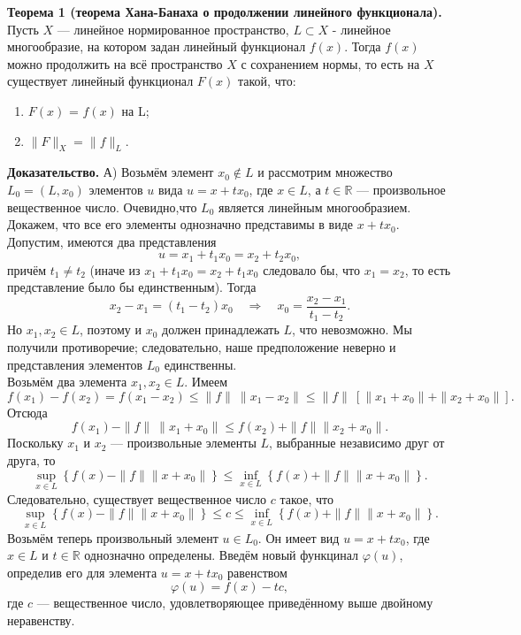 \documentclass[12pt,a4paper, titlepage]{article}
\begin{document}
\textbf{Теорема 1 (теорема Хана-Банаха о продолжении линейного функционала).} Пусть $X$ --- линейное нормированное пространство, $L \subset X$ - линейное многообразие, на котором задан линейный функционал $f(x)$. Тогда $f(x)$ можно продолжить на всё пространство $X$ с сохранением нормы, то есть на $X$ существует линейный функционал $F(x)$ такой, что:
\begin{enumerate}
\item
$F(x)$ = $f(x)$ на L;
\item
$\|F\|_X = \|f\|_L$.
\end{enumerate}

\textbf{Доказательство.}
А) Возьмём элемент $x_0 \notin L$ и рассмотрим множество $L_0 = (L, x_0)$ элементов $u$ вида $u = x + tx_0$, где $x \in L$, а $t \in \mathbb{R}$ --- произвольное вещественное число. Очевидно,что $L_0$ является линейным многообразием. Докажем, что все его элементы однозначно представимы в виде $x + tx_0$. Допустим, имеются два представления
$$
u = x_1 + t_1 x_0 = x_2 + t_2 x_0,
$$
причём $t_1 \neq t_2$ (иначе из $x_1 + t_1 x_0 = x_2 + t_1 x_0$ следовало бы, что $x_1 = x_2$, то есть представление было бы единственным). Тогда
$$
x_2 - x_1 = (t_1 - t_2) x_0 \quad \Rightarrow \quad x_0 = \frac{x_2 - x_1}{t_1 - t_2}.
$$
Но $x_1, x_2 \in L$, поэтому и $x_0$ должен принадлежать $L$, что невозможно. Мы получили противоречие; следовательно, наше предположение неверно и представления элементов $L_0$ единственны.\\

Возьмём два элемента $x_1, x_2 \in L$. Имеем
$$
f(x_1) - f(x_2) = f(x_1 - x_2) \leqslant \|f\| \ \|x_1 - x_2\| \leqslant \|f\| \ [\|x_1 + x_0\| + \|x_2 + x_0\|].
$$
Отсюда
$$
f(x_1) - \|f\| \ \|x_1 + x_0\| \leqslant f(x_2) + \|f\| \|x_2 + x_0\|.
$$
Поскольку $x_1$ и $x_2$ --- произвольные элементы $L$, выбранные независимо друг от друга, то
$$
\sup_{x\in L} \left\{ f(x) - \|f\| \|x + x_0\| \right\} \leqslant
\inf_{x \in L} \left\{ f(x) + \|f\| \|x + x_0\| \right\}.
$$
Следовательно, существует вещественное число $c$ такое, что
$$
\sup_{x\in L} \left\{ f(x) - \|f\| \|x + x_0\| \right\} \leqslant c \leqslant
\inf_{x \in L} \left\{ f(x) + \|f\| \|x + x_0\| \right\}.
$$
Возьмём теперь произвольный элемент $u \in L_0$. Он имеет вид $u = x + tx_0$, где $x \in L$ и $t \in \mathbb{R}$ однозначно определены. Введём новый функцинал $\varphi(u)$, определив его для элемента $u = x + tx_0$ равенством
$$
\varphi(u) = f(x) - tc,
$$
где $c$ --- вещественное число, удовлетворяющее приведённому выше двойному неравенству.\\
\end{document}
